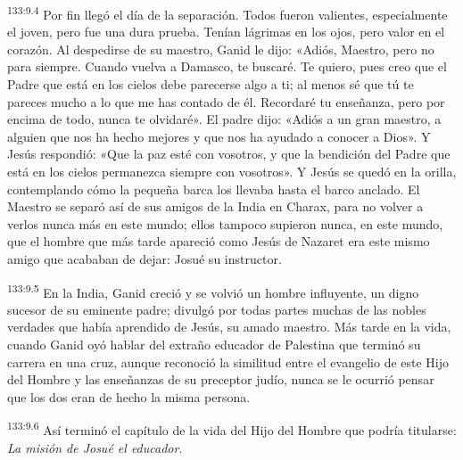 \par
\textsuperscript{133:9.4} Por fin llegó el día de la separación. Todos fueron valientes, especialmente el joven, pero fue una dura prueba. Tenían lágrimas en los ojos, pero valor en el corazón. Al despedirse de su maestro, Ganid le dijo: «Adiós, Maestro, pero no para siempre. Cuando vuelva a Damasco, te buscaré. Te quiero, pues creo que el Padre que está en los cielos debe parecerse algo a ti; al menos sé que tú te pareces mucho a lo que me has contado de él. Recordaré tu enseñanza, pero por encima de todo, nunca te olvidaré». El padre dijo: «Adiós a un gran maestro, a alguien que nos ha hecho mejores y que nos ha ayudado a conocer a Dios». Y Jesús respondió: «Que la paz esté con vosotros, y que la bendición del Padre que está en los cielos permanezca siempre con vosotros». Y Jesús se quedó en la orilla, contemplando cómo la pequeña barca los llevaba hasta el barco anclado. El Maestro se separó así de sus amigos de la India en Charax, para no volver a verlos nunca más en este mundo; ellos tampoco supieron nunca, en este mundo, que el hombre que más tarde apareció como Jesús de Nazaret era este mismo amigo que acababan de dejar: Josué su instructor.

\par
\textsuperscript{133:9.5} En la India, Ganid creció y se volvió un hombre influyente, un digno sucesor de su eminente padre; divulgó por todas partes muchas de las nobles verdades que había aprendido de Jesús, su amado maestro. Más tarde en la vida, cuando Ganid oyó hablar del extraño educador de Palestina que terminó su carrera en una cruz, aunque reconoció la similitud entre el evangelio de este Hijo del Hombre y las enseñanzas de su preceptor judío, nunca se le ocurrió pensar que los dos eran de hecho la misma persona.

\par
\textsuperscript{133:9.6} Así terminó el capítulo de la vida del Hijo del Hombre que podría titularse: \textit{La misión de Josué el educador}.